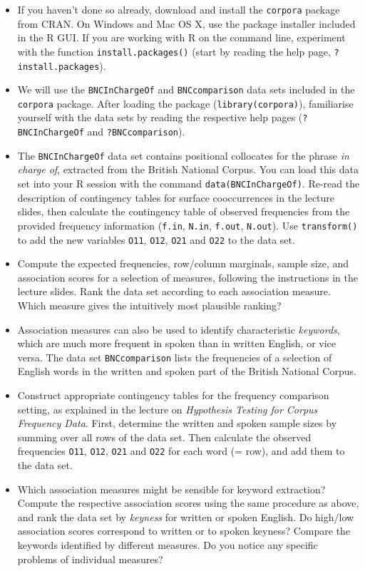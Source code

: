 \documentclass[a4paper,12pt]{article}
\begin{document}
\begin{itemize}
\item If you haven't done so already, download and install the
  \texttt{corpora} package from CRAN.  On Windows and Mac OS X, use the
  package installer included in the R GUI.  If you are working with R on the
  command line, experiment with the function \texttt{install.packages()}
  (start by reading the help page, \texttt{?install.packages}).
\item We will use the \texttt{BNCInChargeOf} and \texttt{BNCcomparison} data
  sets included in the \texttt{corpora} package. After loading the package
  (\texttt{library(corpora)}), familiarise yourself with the data sets by
  reading the respective help pages (\texttt{?BNCInChargeOf} and
  \texttt{?BNCcomparison}).
\item The \texttt{BNCInChargeOf} data set contains positional collocates for
  the phrase \emph{in charge of}, extracted from the British National Corpus.
  You can load this data set into your R session with the command
  \texttt{data(BNCInChargeOf)}.  Re-read the description of contingency tables
  for surface cooccurrences in the lecture slides, then calculate the
  contingency table of observed frequencies from the provided frequency
  information (\texttt{f.in}, \texttt{N.in}, \texttt{f.out}, \texttt{N.out}).
  Use \texttt{transform()} to add the new variables \texttt{O11},
  \texttt{O12}, \texttt{O21} and \texttt{O22} to the data set.
\item Compute the expected frequencies, row/column marginals, sample size, and
  association scores for a selection of measures, following the instructions
  in the lecture slides.  Rank the data set according to each association
  measure.  Which measure gives the intuitively most plausible ranking?
\item Association measures can also be used to identify characteristic
  \emph{keywords}, which are much more frequent in spoken than in written
  English, or vice versa.  The data set \texttt{BNCcomparison} lists the
  frequencies of a selection of English words in the written and spoken part
  of the British National Corpus.
\item Construct appropriate contingency tables for the frequency comparison
  setting, as explained in the lecture on \emph{Hypothesis Testing for Corpus
    Frequency Data}.  First, determine the written and spoken sample sizes by
  summing over all rows of the data set.  Then calculate the observed
  frequencies \texttt{O11}, \texttt{O12}, \texttt{O21} and \texttt{O22} for
  each word (= row), and add them to the data set.
\item Which association measures might be sensible for keyword extraction?
  Compute the respective association scores using the same procedure as above,
  and rank the data set by \emph{keyness} for written or spoken English.  Do
  high/low association scores correspond to written or to spoken keyness?
  Compare the keywords identified by different measures.  Do you notice any
  specific problems of individual measures?
\end{itemize}
\end{document}
